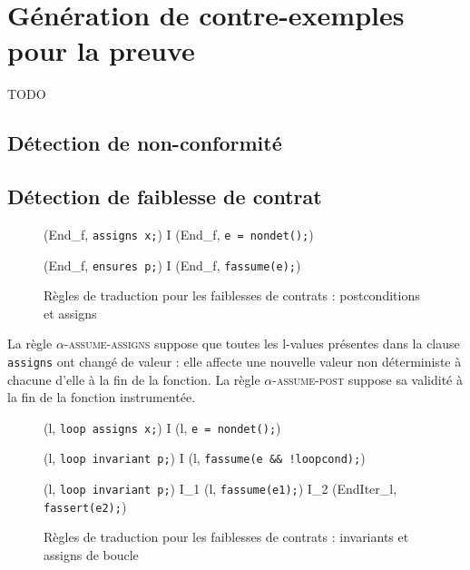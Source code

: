 
\chapter{Génération de contre-exemples pour la preuve}
\label{sec:ce}


TODO

\section{Détection de non-conformité}
\section{Détection de faiblesse de contrat}

\begin{figure}[bt]
  \scriptsize{
    {
      {(End_f, \mbox{\lstinline'assigns x;'})
        I \concat (End_f, \mbox{\lstinline'e = nondet();'})}
    }

    {
      {(End_f, \mbox{\lstinline'ensures p;'})
        I \concat (End_f, \mbox{\lstinline'fassume(e);'})}
    }
  }
  \caption{Règles de traduction pour les faiblesses de contrats :
    postconditions et assigns}
  \label{fig:assume-annot}
\end{figure}

La règle \textsc{$\alpha$-assume-assigns} suppose que toutes les l-values
présentes dans la clause \lstinline'assigns' ont changé de valeur : elle affecte
une nouvelle valeur non déterministe à chacune d'elle à la fin de la fonction.
La règle \textsc{$\alpha$-assume-post} suppose sa validité à la fin de la
fonction instrumentée.

\begin{figure}[bt]
  \scriptsize{
    {
      {(l, \mbox{\lstinline'loop assigns x;'})
        I \concat (l, \mbox{\lstinline'e = nondet();'})}
    }

    {
      {
        (l, \mbox{\lstinline'loop invariant p;'}) 
        I \concat (l, \mbox{\lstinline'fassume(e && !loopcond);'})
      }
    }

    {
      {
        (l, \mbox{\lstinline'loop invariant p;'}) 
        I_1 \concat (l, \mbox{\lstinline'fassume(e1);'})
        \concat I_2 \concat (EndIter_l, \mbox{\lstinline'fassert(e2);'})
      }
    }
  }
  \caption{Règles de traduction pour les faiblesses de contrats :
    invariants et assigns de boucle}
  \label{fig:assume-loop-annot}
\end{figure}

